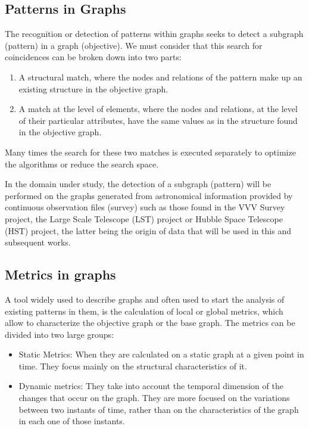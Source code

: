 	\subsection{Patterns in Graphs}
	
	The recognition or detection of patterns within graphs seeks to detect a subgraph (pattern) in a graph (objective). We must consider that this search for coincidences can be broken down into two parts:
	
	\begin{enumerate}
		\item A structural match, where the nodes and relations of the pattern make up an existing structure in the objective graph.
		\item A match at the level of elements, where the nodes and relations, at the level of their particular attributes, have the same values as in the structure found in the objective graph.
	\end{enumerate}

	Many times the search for these two matches is executed separately to optimize the algorithms or reduce the search space\cite{fan2012graph}.
	
	In the domain under study, the detection of a subgraph (pattern) will be performed on the graphs generated from astronomical information provided by continuous observation files (survey) such as those found in the VVV Survey project, the Large Scale Telescope (LST) project or Hubble Space Telescope (HST) project, the latter being the origin of data that will be used in this and subsequent works.
	
	\subsection{Metrics in graphs}
	
	A tool widely used to describe graphs and often used to start the analysis of existing patterns in them, is the calculation of local or global metrics\cite{van2010graph}, which allow to characterize the objective graph or the base graph. The metrics can be divided into two large groups:
	
	\begin{itemize}
		\item Static Metrics: When they are calculated on a static graph at a given point in time. They focus mainly on the structural characteristics of it.
		\item Dynamic metrics: They take into account the temporal dimension of the changes that occur on the graph. They are more focused on the variations between two instants of time, rather than on the characteristics of the graph in each one of those instants.
	\end{itemize}

